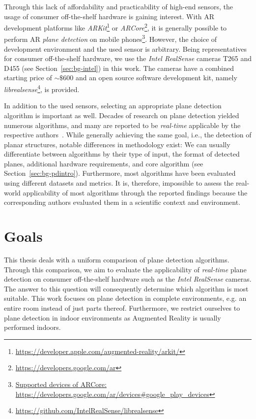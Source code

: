 \documentclass[main.tex]{subfiles}
\begin{document}
Through this lack of affordability and practicability of high-end sensors, the usage of consumer off-the-shelf hardware is gaining interest.
With AR development platforms like \textit{ARKit}\footnote{\href{https://developer.apple.com/augmented-reality/arkit/}{https://developer.apple.com/augmented-reality/arkit/}} or \textit{ARCore}\footnote{\href{https://developers.google.com/ar}{https://developers.google.com/ar}}, it is generally possible to perform AR \textit{plane detection} on mobile phones\footnote{\href{https://developers.google.com/ar/devices\#google\_play\_devices}{Supported devices of ARCore: https://developers.google.com/ar/devices\#google\_play\_devices}}. However, the choice of development environment and the used sensor is arbitrary.
Being representatives for consumer off-the-shelf hardware, we use the \textit{Intel RealSense} cameras T265 and D455 (see Section~\ref{sec:bg-intel}) in this work. The cameras have a combined starting price of ${\sim}\$600$ and an open source software development kit, namely \textit{librealsense}\footnote{\href{https://github.com/IntelRealSense/librealsense}{https://github.com/IntelRealSense/librealsense}}, is provided.

In addition to the used sensors, selecting an appropriate plane detection algorithm is important as well.
Decades of research on plane detection yielded numerous algorithms, and many are reported to be \textit{real-time} applicable by the respective authors~\cite{LimbergerOliveira2015HT3D, Roychoudhury_Missura_Bennewitz_2021_new, Xu_Xie_Chen_Wang_2020, yoohyun,Feng_Taguchi_Kamat_2014, 7953305}.
While generally achieving the same goal, i.e., the detection of planar structures, notable differences in methodology exist: We can usually differentiate between algorithms by their type of input, the format of detected planes, additional hardware requirements, and core algorithm (see Section~\ref{sec:bg-pdintro}). Furthermore, most algorithms have been evaluated using different datasets and metrics.
It is, therefore, impossible to assess the real-world applicability of most algorithms through the reported findings because the corresponding authors evaluated them in a scientific context and environment.

\section{Goals}
\label{sec:goals}
This thesis deals with a uniform comparison of plane detection algorithms.
Through this comparison, we aim to evaluate the applicability of \textit{real-time} plane detection on consumer off-the-shelf hardware such as the \textit{Intel RealSense} cameras. The answer to this question will consequently determine which algorithm is most suitable.
This work focuses on plane detection in complete environments, e.g. an entire room instead of just parts thereof.
Furthermore, we restrict ourselves to plane detection in indoor environments as Augmented Reality is usually performed indoors.
\end{document}
